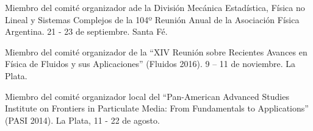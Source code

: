 \begin{timeline}
   Miembro del comité organizador ade la División Mecánica Estadística, Física no Lineal y Sistemas Complejos de la 104º Reunión Anual de la Asociación Física Argentina. 21 - 23 de septiembre. Santa Fé.

   Miembro del comité organizador de la ``XIV Reunión sobre Recientes Avances en Física de Fluidos y sus Aplicaciones'' (Fluidos 2016). 9 -- 11 de noviembre. La Plata.

   Miembro del comité organizador local del ``Pan-American Advanced Studies Institute on Frontiers in Particulate Media: From Fundamentals to Applications'' (PASI 2014). La Plata, 11 - 22 de agosto.
\end{timeline}
